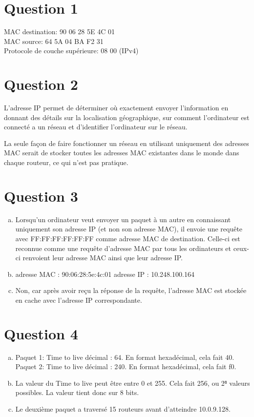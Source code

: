 
\section{Question 1}
MAC destination: 90 06 28 5E 4C 01\\ 
MAC source: 64 5A 04 BA F2 31\\
Protocole de couche supérieure: 08 00 (IPv4)

\section{Question 2}
L'adresse IP permet de déterminer où exactement envoyer l'information  en donnant des détails sur la localisation géographique, sur comment l'ordinateur est connecté a un réseau et d'identifier l'ordinateur sur le réseau.

La seule façon de faire fonctionner un réseau en
utilisant uniquement des adresses MAC serait de
stocker toutes les adresses MAC existantes dans le monde
dans chaque routeur, ce qui n’est pas pratique.

\section{Question 3}
\begin{enumerate}[(a)]
	\item Lorsqu'un ordinateur veut envoyer un paquet à un autre en connaissant uniquement son adresse IP (et non son adresse MAC), il envoie une requête avec FF:FF:FF:FF:FF:FF comme adresse MAC de destination. Celle-ci est reconnue comme une requête d'adresse MAC par tous les ordinateurs et ceux-ci renvoient leur adresse MAC ainsi que leur adresse IP.
	\item adresse MAC : 90:06:28:5e:4c:01
	adresse IP : 10.248.100.164
	\item Non, car après avoir reçu la réponse de
	la requête, l'adresse MAC est stockée en cache
	 avec l'adresse IP correspondante.
\end{enumerate}

\section{Question 4}
\begin{enumerate}[(a)]
	\item Paquet 1: Time to live décimal : 64. En format hexadécimal, cela fait 40. 
	Paquet 2: Time to live décimal : 240. En format hexadécimal, cela fait f0.
	\item La valeur du Time to live peut être entre 0 et 255. Cela fait 256, ou 2⁸ valeurs possibles. La valeur tient donc sur 8 bits.

	\item Le deuxième paquet a traversé 15 routeurs avant d'atteindre 10.0.9.128.
\end{enumerate}
